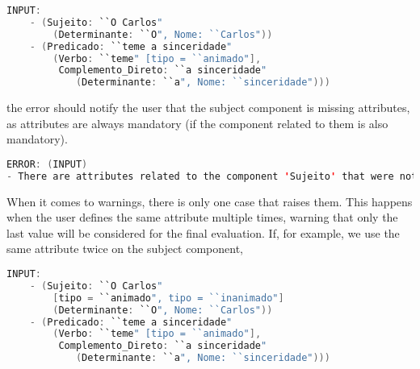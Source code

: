 \begin{center}
\begin{minipage}{13cm}
\begin{lstlisting}[language=java, basicstyle=\small, label={lst:meta_input_missing_attr}, caption=Example of the students parsing with missing attribute]
INPUT:
    - (Sujeito: ``O Carlos"
        (Determinante: ``O", Nome: ``Carlos"))
    - (Predicado: ``teme a sinceridade" 
        (Verbo: ``teme" [tipo = ``animado"], 
         Complemento_Direto: ``a sinceridade" 
            (Determinante: ``a", Nome: ``sinceridade")))
\end{lstlisting}
\end{minipage}
\end{center}

\noindent the error should notify the user that the subject component is missing attributes, as attributes are always mandatory (if the component related to them is also
mandatory).

\begin{center}
\begin{minipage}{14cm}
\begin{lstlisting}[language=java, basicstyle=\small, label={lst:err_msg_missing_attr}, caption=Example error message of missing attributes]
ERROR: (INPUT)
- There are attributes related to the component 'Sujeito' that were not defined.
\end{lstlisting}
\end{minipage}
\end{center}

When it comes to warnings, there is only one case that raises them. This happens when the user defines the same attribute multiple times, warning that only the last value 
will be considered for the final evaluation. If, for example, we use the same attribute twice on the subject component,

\begin{center}
\begin{minipage}{14cm}
\begin{lstlisting}[language=java, basicstyle=\small, label={lst:meta_input_attr_twice}, caption=Example of the students parsing with the same attribute in a single component]
INPUT:
    - (Sujeito: ``O Carlos" 
        [tipo = ``animado", tipo = ``inanimado"]
        (Determinante: ``O", Nome: ``Carlos"))
    - (Predicado: ``teme a sinceridade" 
        (Verbo: ``teme" [tipo = ``animado"], 
         Complemento_Direto: ``a sinceridade" 
            (Determinante: ``a", Nome: ``sinceridade")))
\end{lstlisting}
\end{minipage}
\end{center}

